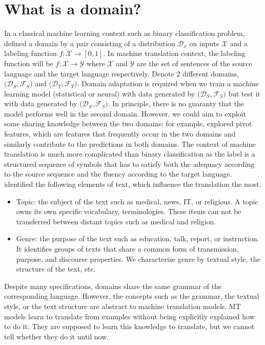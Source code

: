 \section{What is a domain?}
\label{sec:domain}
In a classical machine learning context such as binary classification problem, \citet{Shai10A} defined a domain by a pair consisting of a distribution $\mathcal{D}_x$ on inputs $\mathcal{X}$ and a labeling function $f: \mathcal{X} \rightarrow [0,1]$. In machine translation context, the labeling function will be $f: \mathcal{X} \rightarrow \mathcal{Y}$ where $\mathcal{X}$ and $\mathcal{Y}$ are the set of sentences of the source language and the target language respectively. Denote 2 different domains, $\big( \mathcal{D}_S, \mathcal{F}_S \big)$ and $\big( \mathcal{D}_T, \mathcal{F}_T \big)$. Domain adaptation is required when we train a machine learning model (statistical or neural) with data generated by $\big(\mathcal{D}_S, \mathcal{F}_S \big)$ but test it with data generated by $\big(\mathcal{D}_S, \mathcal{F}_S \big)$. In principle, there is no guaranty that the model performs well in the second domain. However, we could aim to exploit some sharing knowledge between the two domains; for example, \citet{Blitzer06Domain} explored pivot features, which are features that frequently occur in the two domains and similarly contribute to the predictions in both domains. The context of machine translation is much more complicated than binary classification as the label is a structured sequence of symbols that has to satisfy both the adequacy according to the source sequence and the fluency according to the target language. \cite{Wees15Whats,Wees17Whats} identified the following elements of text, which influence the translation the most.
\begin{itemize}
	\item Topic: the subject of the text such as medical, news, IT, or religious. A topic owns its own specific vocabulary, terminologies. These items can not be transferred between distant topics such as medical and religion.
	\item Genre: the purpose of the text such as education, talk, report, or instruction. It identifies groups of texts that share a common form of transmission, purpose, and discourse properties. We characterize genre by textual style, the structure of the text, etc.
\end{itemize}

Despite many specifications, domains share the same grammar of the corresponding language. However, the concepts such as the grammar, the textual style, or the text structure are abstract to machine translation models. MT models learn to translate from examples without being explicitly explained how to do it. They are supposed to learn this knowledge to translate, but we cannot tell whether they do it until now.

